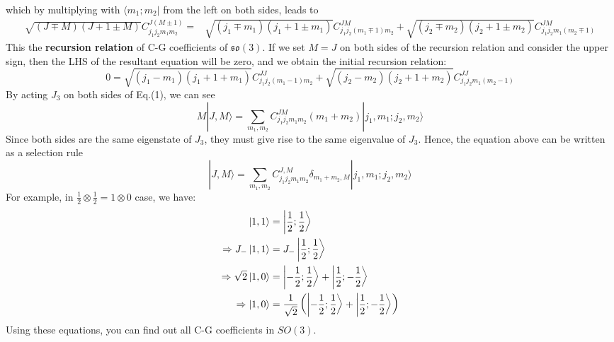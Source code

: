 \documentclass{article}
\begin{document}
	which by multiplying with $\langle  m_{1} ;m_{2}| $ from the left on both sides, leads to
	\begin{equation*}
		\begin{aligned}
			\sqrt{(J\mp M)(J+1\pm M)} C_{j_{1} j_{2} m_{1} m_{2}}^{J(M\pm 1)} = & \sqrt{( j_{1} \mp m_{1})( j_{1} +1\pm m_{1})} C_{j_{1} j_{2}( m_{1} \mp 1) m_{2}}^{JM} +\sqrt{( j_{2} \mp m_{2})( j_{2} +1\pm m_{2})} C_{j_{1} j_{2} m_{1}( m_{2} \mp 1)}^{JM}
		\end{aligned}
	\end{equation*}
	This the \textbf{recursion relation} of C-G coefficients of $\mathfrak{so}( 3)$. If we set $M=J$ on both sides of the recursion relation and consider the upper sign, then the LHS of the resultant equation will be zero, and we obtain the initial recursion relation:
	\begin{equation*}
		0=\sqrt{( j_{1} -m_{1})( j_{1} +1+m_{1})} C_{j_{1} j_{2}( m_{1} -1) m_{2}}^{JJ} +\sqrt{( j_{2} -m_{2})( j_{2} +1+m_{2})} C_{j_{1} j_{2} m_{1}( m_{2} -1)}^{JJ}
	\end{equation*}
	By acting $J_{3}$ on both sides of Eq.(1), we can see
	\begin{equation*}
		M|J,M\rangle  =\sum _{m_{1} ,m_{2}} C_{j_{1} j_{2} m_{1} m_{2}}^{JM}( m_{1} +m_{2})| j_{1} ,m_{1} ;j_{2} ,m_{2}\rangle 
	\end{equation*}
	Since both sides are the same eigenstate of $J_{3}$, they must give rise to the same eigenvalue of $J_{3}$. Hence, the equation above can be written as a selection rule
	\begin{equation*}
		|J,M\rangle  =\sum _{m_{1} ,m_{2}} C_{j_{1} j_{2} m_{1} m_{2}}^{J,M} \delta _{m_{1} +m_{2} ,M}| j_{1} ,m_{1} ;j_{2} ,m_{2}\rangle 
	\end{equation*}
	For example, in $\frac{1}{2} \otimes \frac{1}{2} =1\otimes 0$ case, we have:
	\begin{equation*}
		\begin{aligned}
			\ket{1,1} & =\ket{\frac{1}{2} ;\frac{1}{2}}\\
			\Rightarrow J_{-}\ket{1,1} & =J_{-}\ket{\frac{1}{2} ;\frac{1}{2}}\\
			\Rightarrow \sqrt{2}\ket{1,0} & =\ket{-\frac{1}{2} ;\frac{1}{2}} +\ket{\frac{1}{2} ;-\frac{1}{2}}\\
			\Rightarrow \ket{1,0} & =\frac{1}{\sqrt{2}}\left(\ket{-\frac{1}{2} ;\frac{1}{2}} +\ket{\frac{1}{2} ;-\frac{1}{2}}\right)
		\end{aligned}
	\end{equation*}
	Using these equations, you can find out all C-G coefficients in $SO( 3)$. 
\end{document}
